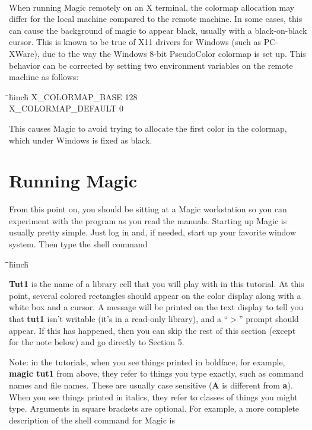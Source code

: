 \documentclass[letterpaper,twoside,12pt]{article}
\def\hinch{\hspace*{0.5in}}
\def\starti{\begin{center}\begin{tabbing}\hinch\=\hinch\=\hinch\=hinch\hinch\=\kill}
\def\endi{\end{tabbing}\end{center}}
\def\ii{\>\>\>}
\begin{document}
\medskip
{} \\
When running Magic remotely on an X terminal, the colormap allocation
may differ for the local machine compared to the remote machine.  In
some cases, this can cause the background of magic to appear black,
usually with a black-on-black cursor.  This is known to be true of
X11 drivers for Windows (such as PC-XWare), due to the way the Windows
8-bit PseudoColor colormap is set up.  This behavior can be corrected
by setting two environment variables on the remote machine as follows:

\starti
   \ii {\bfseries setenv} {\ttfamily X\_COLORMAP\_BASE 128} \\
   \ii {\bfseries setenv} {\ttfamily X\_COLORMAP\_DEFAULT 0} \\
\endi

This causes Magic to avoid trying to allocate the first color
in the colormap, which under Windows is fixed as black.

\section{Running Magic}

From this point on, you should be sitting at a Magic workstation
so you can experiment with the program as you read the manuals.
Starting up Magic is usually pretty simple.  Just log in and, if needed,
start up your favorite window system.  Then type the shell command

\starti
   \ii {\bfseries magic tut1}
\endi

{\bfseries Tut1} is the name of a library cell that you will play
with in this tutorial.
At this point, several colored rectangles should appear
on the color display along with a white box and a cursor.
A message will be printed on the text display to tell you that
{\bfseries tut1} isn't writable (it's in a read-only library),
and a ``$>$'' prompt should appear.
If this has happened, then you can skip the rest of this
section (except for the note below) and go directly to Section 5.

Note: in the tutorials, when you see things printed in boldface,
for example, {\bfseries magic tut1} from above, they refer to things
you type exactly, such as command names and file names.  These
are usually case sensitive ({\bfseries A} is different from {\bfseries a}).
When you see things printed in italics, they refer to classes of
things you might type.  Arguments in square brackets are optional.
For example, a more complete description
of the shell command for Magic is
\end{document}
